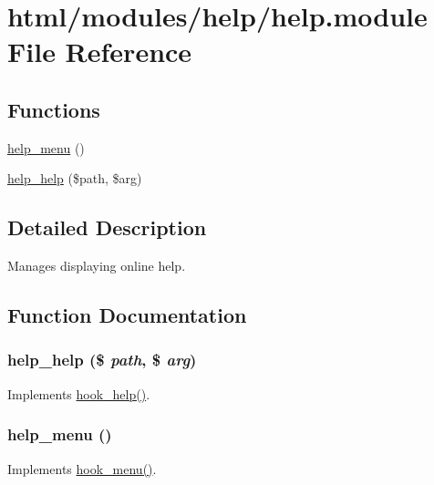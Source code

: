 \hypertarget{help_8module}{
\section{html/modules/help/help.module File Reference}
\label{help_8module}
}
\subsection*{Functions}
\begin{DoxyCompactItemize}
\item 
\hyperlink{help_8module_ae430a409f4c7059e92cc4ea8d8610d9c}{help\_\-menu} ()
\item 
\hyperlink{help_8module_a68feb4c432ff501196250c58be00d996}{help\_\-help} (\$path, \$arg)
\end{DoxyCompactItemize}


\subsection{Detailed Description}
Manages displaying online help. 

\subsection{Function Documentation}
\hypertarget{help_8module_a68feb4c432ff501196250c58be00d996}{
\subsubsection[{help\_\-help}]{\setlength{\rightskip}{0pt plus 5cm}help\_\-help (\$ {\em path}, \/  \$ {\em arg})}}
\label{help_8module_a68feb4c432ff501196250c58be00d996}
Implements \hyperlink{group__hooks_ga5589c2714a782738e8851c4c90231f0e}{hook\_\-help()}. \hypertarget{help_8module_ae430a409f4c7059e92cc4ea8d8610d9c}{
\subsubsection[{help\_\-menu}]{\setlength{\rightskip}{0pt plus 5cm}help\_\-menu ()}}
\label{help_8module_ae430a409f4c7059e92cc4ea8d8610d9c}
Implements \hyperlink{group__hooks_ga5c95244fea59b25666e409759e133ded}{hook\_\-menu()}. 